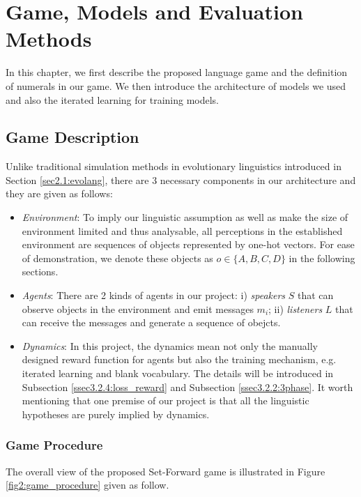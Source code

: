 \chapter{Game, Models and Evaluation Methods}
\label{ch3:game_model}

In this chapter, we first describe the proposed language game and the definition of numerals in our game. We then introduce the architecture of models we used and also the iterated learning for training models.

\section{Game Description}
\label{sec3.1:game_description}

Unlike traditional simulation methods in evolutionary linguistics introduced in Section \ref{sec2.1:evolang}, there are 3 necessary components in our architecture and they are given as follows:

\begin{itemize}
  \item \textit{Environment}: To imply our linguistic assumption as well as make the size of environment limited and thus analysable, all perceptions in the established environment are sequences of objects represented by one-hot vectors. For ease of demonstration, we denote these objects as $o \in \{ A, B, C, D\}$ in the following sections.
  \item \textit{Agents}: There are 2 kinds of agents in our project: i) \textit{speakers} $S$ that can observe objects in the environment and emit messages $m_i$; ii) \textit{listeners} $L$ that can receive the messages and generate a sequence of obejcts.
  \item \textit{Dynamics}: In this project, the dynamics mean not only the manually designed reward function for agents but also the training mechanism, e.g. iterated learning and blank vocabulary. The details will be introduced in Subsection \ref{ssec3.2.4:loss_reward} and Subsection \ref{ssec3.2.2:3phase}. It worth mentioning that one premise of our project is that all the linguistic hypotheses are purely implied by dynamics.
\end{itemize}

\subsection{Game Procedure}
\label{ssec3.1.1:game_procedure}

The overall view of the proposed Set-Forward game is illustrated in Figure \ref{fig2:game_procedure} given as follow.

